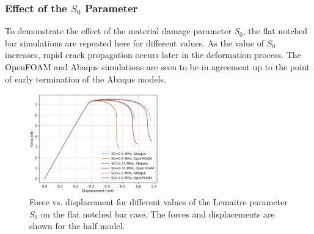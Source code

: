 \documentclass[sn-mathphys,Numbered]{sn-jnl}%
\begin{document}











\subsubsection{Effect of the $S_0$ Parameter}
To demonstrate the effect of the material damage parameter $S_0$, the flat notched bar simulations are repeated here for different values.
As the value of $S_0$ increases, rapid crack propagation occurs later in the deformation process.
The OpenFOAM and Abaqus simulations are seen to be in agreement up to the point of early termination of the Abaqus models.
\begin{figure}[htb]
\begin{center}
	\includegraphics[width=0.5\textwidth]{./Figures/LemaitreCompare/borden/lemaitreBordenCompare.png}
\caption{Force vs. displacement for different values of the Lemaitre parameter $S_0$ on the flat notched bar case. The forces and displacements are shown for the half model.}
\end{center}
\end{figure}
\end{document}
